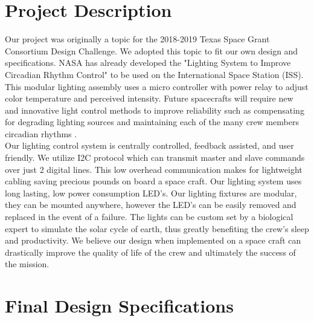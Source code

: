 \documentclass[12pt,a4paper]{report}
\begin{document}
\section{Project Description}
Our project was originally a topic for the 2018-2019 Texas Space Grant Consortium Design Challenge. We adopted this topic to fit our own design and specifications. NASA has already developed the "Lighting System to Improve Circadian Rhythm Control" to be used on the International Space Station (ISS). \cite{nasapatent} This modular lighting assembly uses a micro controller with power relay to adjust color temperature and perceived intensity. Future spacecrafts will require new and innovative light control methods to improve reliability such as compensating for degrading lighting sources and maintaining each of the many crew members circadian rhythms \cite{tsgc}. \\ \linebreak
Our lighting control system is centrally controlled, feedback assisted, and user friendly. We utilize I2C protocol which can transmit master and slave commands over just 2 digital lines. This low overhead communication makes for lightweight cabling saving precious pounds on board a space craft. Our lighting system uses long lasting, low power consumption LED's. Our lighting fixtures are modular, they can be mounted anywhere, however the LED's can be easily removed and replaced in the event of a failure. The lights can be custom set by a biological expert to simulate the solar cycle of earth, thus greatly benefiting the crew's sleep and productivity. We believe our design when implemented on a space craft can drastically improve the quality of life of the crew and ultimately the success of the mission.



\section{Final Design Specifications}
\end{document}
